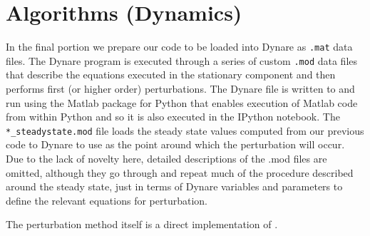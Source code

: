 \documentclass[11pt]{article}
\newcommand{\code}[1]{\texttt{#1}}
\begin{document}
 \section{Algorithms (Dynamics)} 
In the final portion we prepare our code to be loaded into Dynare as \code{.mat} data files. The Dynare program is executed through a series of custom \code{.mod} data files that describe the equations executed in the stationary component and then performs first (or higher order) perturbations. The Dynare file is written to and run using the Matlab package for Python that enables execution of Matlab code from within Python and so it is also executed in the IPython notebook. The \code{*\_steadystate.mod} file loads the steady state values computed from our previous code to Dynare to use as the point around which the perturbation will occur.
Due to the lack of novelty here, detailed descriptions of the .mod files are omitted, although they go through and repeat much of the procedure described around the steady state, just in terms of Dynare variables and parameters to define the relevant equations for perturbation. \par The perturbation method itself is a direct implementation of \cite{Schmitt-Grohe2004}. 
\end{document}
